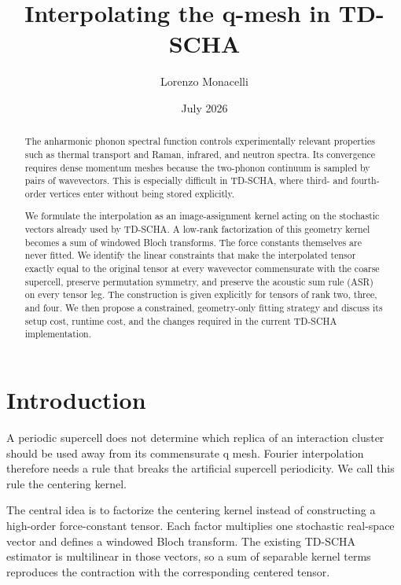 \documentclass{article}
\title{Interpolating the q-mesh in TD-SCHA}
\author{Lorenzo Monacelli}
\date{July 2026}
\begin{document}
\maketitle

\begin{abstract}
The anharmonic phonon spectral function controls experimentally relevant
properties such as thermal transport and Raman, infrared, and neutron
spectra. Its convergence requires dense momentum meshes because the
two-phonon continuum is sampled by pairs of wavevectors. This is especially
difficult in TD-SCHA, where third- and fourth-order vertices enter without
being stored explicitly.

We formulate the interpolation as an image-assignment kernel acting on the
stochastic vectors already used by TD-SCHA. A low-rank factorization of this
geometry kernel becomes a sum of windowed Bloch transforms. The force
constants themselves are never fitted. We identify the linear constraints
that make the interpolated tensor exactly equal to the original tensor at
every wavevector commensurate with the coarse supercell, preserve
permutation symmetry, and preserve the acoustic sum rule (ASR) on every
tensor leg. The construction is given explicitly for tensors of rank two,
three, and four. We then propose a constrained, geometry-only fitting
strategy and discuss its setup cost, runtime cost, and the changes required
in the current TD-SCHA implementation.
\end{abstract}

\section{Introduction}
\label{sec:introduction}

A periodic supercell does not determine which replica of an interaction
cluster should be used away from its commensurate q mesh. Fourier
interpolation therefore needs a rule that breaks the artificial supercell
periodicity. We call this rule the centering kernel.

The central idea is to factorize the centering kernel instead of constructing
a high-order force-constant tensor. Each factor multiplies one stochastic
real-space vector and defines a windowed Bloch transform. The existing
TD-SCHA estimator is multilinear in those vectors, so a sum of separable
kernel terms reproduces the contraction with the corresponding centered
tensor.
\end{document}
